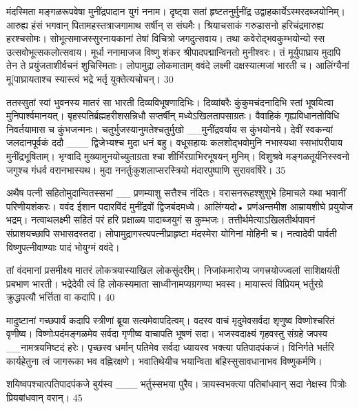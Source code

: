   मंदस्मिता मङ्गळरूपवेषा मुनींद्रपादान युगं ननाम।
 दृष्ट्वा सतां हृष्टतनुर्मुनींद्र
उद्वाहकार्येऽस्मरदब्जयोनिम्।
 आरुह्य हंसं भगवान् पितामहस्तत्राजगामाथ
सर्षीन् स संघमैः।
 श्रियाचसाकं गरुडासनो
हरिचंद्रमारुह्य हरश्चसोमः।
 सोभूत्समाजस्सुरनायकानां तेषां
विचित्रो जगदुत्सवाय।
 तथा कवेरोद्भवकुम्भयोन्यो
स्स उत्सवोभूत्सकलोत्सवाय।
 मूर्धा ननामाजज विष्णु शंकर
श्रीपादपद्मान्विनतो मुनीश्वरः।
 तं मूर्युपाघ्राय मुदापि तेन ते
प्रयुंजताशीर्वचनं शुचिस्मिताः।
 लोपामुद्रा लोकमाताम् ववंदे लक्ष्मी
दक्षस्यात्मजां भारती च।
 आलिंग्यैनां मू[पाघ्रायताश्च स्यास्त्वं
भद्रे भर्तृ युक्तेत्यचोचन्।
 30

  ततस्सुतां स्वां भुवनस्य मातरं
सा भारती दिव्यविभूषणादिभिः।
 दिव्यांबरैः कुंकुमचंदनादिभि स्तां
भूषयित्वा मुनिपार्श्वमानयत्।
 बृहस्पतिर्ब्रह्महरीशसन्निधौ
सप्तर्षीन् मध्येऽखिलतापसाग्रतः।
 वैवाहिकं गृह्यविधानतोविधि
निवर्तयामास च कुंभजन्मनः।
 चतुर्भुजस्यानुमतेश्चतुर्मुखो
__मुनींद्रवर्याय स कुंभयोनये।
 देवीं स्वकन्यां जलदानपूर्वकं ददौ
___ द्विजेभ्यश्च मुदा धनं बहु।
 वधूसहायः कलशोद्भवोमुनि
नभास्यथा
स्सभांपरीयाय मुनींद्रभूषिताम्।
 भृग्वादि मुख्यामुनयोच्युताग्रता
श्चा शीर्भिरग्राभिरभूषयन् मुनिम्।
 विशुश्रवे मङ्गळतूर्यनिस्स्वनो जगुश्च
गंधर्व वरानभास्यथ।
 मुदा ननर्तुःकुशलाप्सरस्त्रियो
मंदारपुष्पाणि सुराववर्षिरे।
35

 अथैष पत्नी सहितोमुदान्वितस्सभां
__ प्रणम्याशु सत्तैश्च नंदितः।
 वरासनरूहश्शुशुभे हिमाचले यथा
भवानीं परिणीयशंकरः।
 ववंद ईशान पदारविंदं मुनींद्रवों द्विजबंदमध्ये।
 आलिंग्यदो• प्रणंअन्तमीश
आम्रायशीघे प्रयुयोज भद्रम्।
 नत्वाथलक्ष्मी सहितं परं हरि प्रक्षाळ्य
पादाब्जयुगं स कुम्भजः।
 तत्तीर्थमेत्याऽखिलतीर्थपावनं
संप्राशयच्छापि सभासदस्तदा।
 लोपामुद्रागस्त्यपत्नीप्राहृष्टा मंदस्मेरा
योगिनां मोहिनी च।
 नत्वादेवी पार्वती विष्णुपत्नीवाण्याः पादं
भोयुग्मं ववंदे।

तां वंदमानां प्रसमीक्ष्य मातरं
लोकत्रयास्याखिल लोकसुंदरीम्।
 निजांकमारोप्य जगत्त्रयोज्ज्वलां
साशिक्षयंती प्रबभाण भारती।
 भद्रेदेवी त्वं हि लोकस्यमाता
साध्वीनामप्यग्रगण्या भवस्व।
 मायास्त्वं विप्रियम् भर्तुरग्रे क्रुद्धपत्यौ
भर्त्तिता वा कदापि।
40

 मादुष्टानां गच्छपार्वं कदापि
स्त्रीणां ब्रूया सत्यमेवापदित्वम्।
 वदस्व वाचं मृदुमेवसर्वदा शृणुष्व
विष्णोश्चरितं वृणीष्व।
 विष्णोःपदंमङ्गळमेव सर्वदा गृणीष्व
वाचापति भूषणं सदा।
 भजस्वदाक्ष्यं गृहवस्तु संग्रहे जपस्व
__नामत्रयमिष्टदं हरेः।
 पृच्छस्व धर्मान् पतिमेव सर्वदा ध्यायस्व
भक्त्या पतिपादपंकजं।
 विनिर्गते भर्तरि कार्यहेतुना त्वं जागरूका
भव वह्निरक्षणे।
 भवातिथेयीच भयान्विता
बहिस्सुसावधानाभव विष्णुकर्मणि।

शयिष्वपश्चात्पतिपादपंकजे बुय॑स्व
___ भर्तुस्सभया पुरैव।
 त्रायस्वभक्त्या पतिबांधवान् सदा
नेक्षस्व पित्रोः प्रियबांधवान् वरान्।
 45

